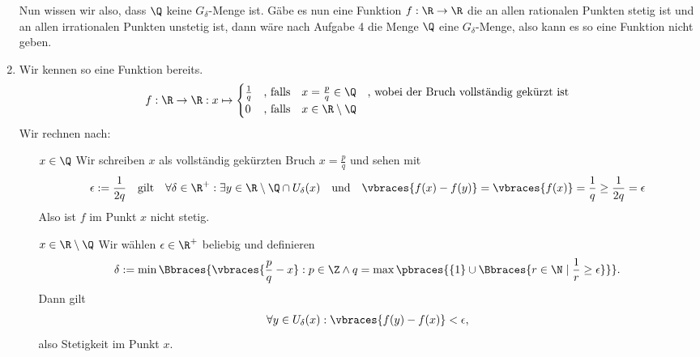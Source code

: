 \begin{solution}
\begin{enumerate}[label = (\roman*)]
  Nun wissen wir also, dass $\Q$ keine $G_\delta$-Menge ist. Gäbe es nun eine Funktion $f: \R \to \R$ die an allen rationalen Punkten stetig ist und an allen irrationalen Punkten unstetig ist, dann wäre nach Aufgabe 4 die Menge $\Q$ eine $G_\delta$-Menge, also kann es so eine Funktion nicht geben.
  \item Wir kennen so eine Funktion bereits. 
  \begin{align*}
    f: \R \to \R: x \mapsto 
    \begin{cases}
      \frac{1}{q} &\textrm{, falls} \quad x = \frac{p}{q} \in \Q \quad \textrm{, wobei der Bruch vollständig gekürzt ist} \\
      0 &\textrm{, falls} \quad x \in \R \setminus \Q
    \end{cases}
  \end{align*}
  Wir rechnen nach:
  \begin{enumerate}
    \item[\glqq $x \in \Q$ \grqq] Wir schreiben $x$ als vollständig gekürzten Bruch $x = \frac{p}{q}$ und sehen mit 
    \begin{align*}
      \epsilon := \frac{1}{2q} \quad \textrm{gilt} \quad \forall\delta \in \R^+: \exists y \in \R \setminus \Q \cap U_\delta(x) \quad \textrm{und} \quad \vbraces{f(x) - f(y)} = \vbraces{f(x)} = \frac{1}{q} \geq \frac{1}{2q} = \epsilon
    \end{align*} 
    Also ist $f$ im Punkt $x$ nicht stetig.
    \item[\glqq $x \in \R \setminus \Q$ \grqq] Wir wählen $\epsilon \in \R^+$ beliebig und definieren 
    \begin{align*} 
      \delta := \min\Bbraces{\vbraces{\frac{p}{q} - x} : p \in \Z \land q = \max\pbraces{\{1\} \cup \Bbraces{r \in \N \mid \frac{1}{r} \geq \epsilon}} }.
    \end{align*}
    Dann gilt 
    \begin{align*}
      \forall y \in U_\delta(x): \vbraces{f(y) -f(x)} < \epsilon,
    \end{align*}
    also Stetigkeit im Punkt $x$.
  \end{enumerate}
\end{enumerate}
\end{solution}

